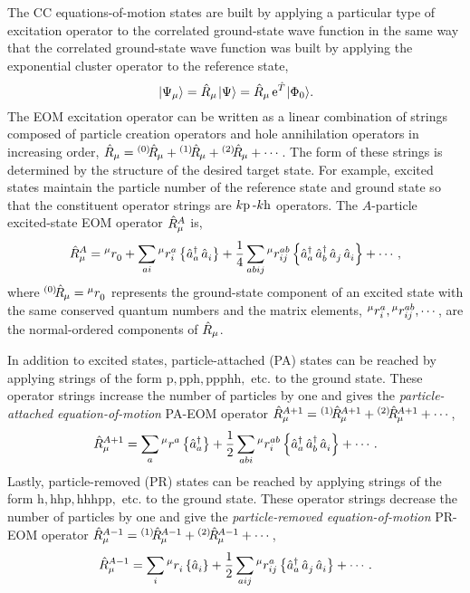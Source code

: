 \documentclass[thesis.tex]{subfiles}
\begin{document}
The CC equations-of-motion states are built by applying a particular type of excitation operator to the correlated ground-state wave function in the same way that the correlated ground-state wave function was built by applying the exponential cluster operator to the reference state,
\begin{equation}\label{eq:eom_def}
  \hspace{1pt}\lvert \Psi_{\mu} \rangle = \hat{R}\hspace{-0.1pt}_{\mu}\hspace{1pt}\lvert \Psi \rangle = \hat{R}\hspace{-0.1pt}_{\mu}\operatorname{e}^{\hat{T}\hspace{-0.25pt}}\hspace{1pt}\lvert \Phi_{0} \rangle.
\end{equation}
The EOM excitation operator can be written as a linear combination of strings composed of particle creation operators and hole annihilation operators in increasing order, $\hat{R}\hspace{-0.1pt}_{\mu} = {}^{\left(0\right)}\hspace{-2pt}\hat{R}\hspace{-0.5pt}_{\mu} + {}^{\left(1\right)}\hspace{-2pt}\hat{R}\hspace{-0.5pt}_{\mu} + {}^{\left(2\right)}\hspace{-2pt}\hat{R}\hspace{-0.5pt}_{\mu} + \cdots$.  The form of these strings is determined by the structure of the desired target state.  For example, excited states maintain the particle number of the reference state and ground state so that the constituent operator strings are $k\mathrm{p}\hspace{2pt}\text{-}k\mathrm{h}$ operators.  The $A$-particle excited-state EOM operator $\hat{R}\hspace{-0.1pt}^{A}_{\mu}$ is,
\begin{equation}
  \hat{R}\hspace{-0.1pt}^{A}_{\mu} = {}^{\mu}r^{}_{0} + \sum_{ai}{}^{\mu}r^{a}_{i}\left\{\mathop{\hat{a}^{\dagger}_{a}}\mathop{\hat{a}^{}_{i}}\right\} + \frac{1}{4}\sum_{abij}{}^{\mu}r^{ab}_{ij}\left\{\mathop{\hat{a}^{\dagger}_{a}}\mathop{\hat{a}^{\dagger}_{b}}\mathop{\hat{a}^{}_{j}}\mathop{\hat{a}^{}_{i}}\right\} + \cdots,
\end{equation}
where ${}^{\left(0\right)}\hspace{-2pt}\hat{R}\hspace{-0.5pt}_{\mu} = {}^{\mu}r^{}_{0}$ represents the ground-state component of an excited state with the same conserved quantum numbers and the matrix elements, ${}^{\mu}r^{a}_{i}, {}^{\mu}r^{ab}_{ij}, \cdots$, are the normal-ordered components of $\hat{R}\hspace{-0.1pt}_{\mu}$.

In addition to excited states, particle-attached (PA) states can be reached by applying strings of the form $\mathrm{p,pph,ppphh,}$ etc. to the ground state.  These operator strings increase the number of particles by one and gives the \textit{particle-attached equation-of-motion} PA-EOM operator $\hat{R}\hspace{-0.1pt}^{A+1}_{\mu} = {}^{\left(1\right)}\hspace{-2pt}\hat{R}\hspace{-0.5pt}^{A+1}_{\mu} + {}^{\left(2\right)}\hspace{-2pt}\hat{R}\hspace{-0.5pt}^{A+1}_{\mu} + \cdots $,
\begin{equation}
  \hat{R}\hspace{-0.1pt}^{A+1}_{\mu} = \sum_{a}{}^{\mu}r^{a}_{}\left\{\mathop{\hat{a}^{\dagger}_{a}}\right\} + \frac{1}{2}\sum_{abi}{}^{\mu}r^{ab}_{i}\left\{\mathop{\hat{a}^{\dagger}_{a}}\mathop{\hat{a}^{\dagger}_{b}}\mathop{\hat{a}^{}_{i}}\right\} + \cdots.
\end{equation}
Lastly, particle-removed (PR) states can be reached by applying strings of the form $\mathrm{h,hhp,hhhpp,}$ etc. to the ground state.  These operator strings decrease the number of particles by one and give the \textit{particle-removed equation-of-motion} PR-EOM operator $\hat{R}\hspace{-0.1pt}^{A-1}_{\mu} = {}^{\left(1\right)}\hspace{-2pt}\hat{R}\hspace{-0.5pt}^{A-1}_{\mu} + {}^{\left(2\right)}\hspace{-2pt}\hat{R}\hspace{-0.5pt}^{A-1}_{\mu} + \cdots $,
\begin{equation}
  \hat{R}\hspace{-0.1pt}^{A-1}_{\mu} = \sum_{i}{}^{\mu}r^{}_{i}\left\{\mathop{\hat{a}^{}_{i}}\right\} + \frac{1}{2}\sum_{aij}{}^{\mu}r^{a}_{ij}\left\{\mathop{\hat{a}^{\dagger}_{a}}\mathop{\hat{a}^{}_{j}}\mathop{\hat{a}^{}_{i}}\right\} + \cdots.
\end{equation}
\end{document}

